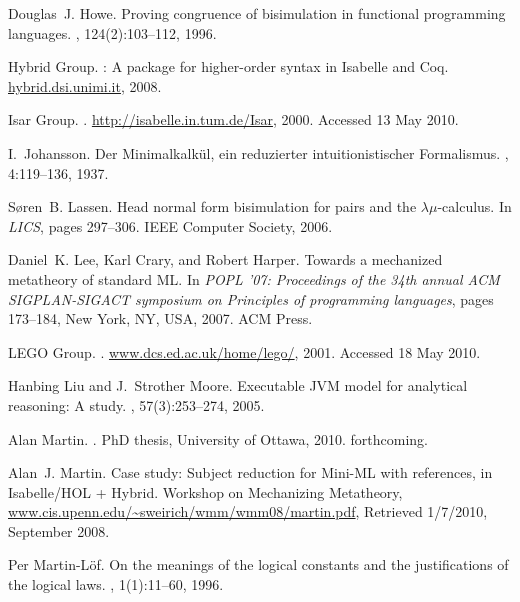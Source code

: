 \documentclass[final]{svjour3}
\begin{document}
\begin{thebibliography}{100}
Douglas~J. Howe.
\newblock Proving congruence of bisimulation in functional programming
  languages.
, 124(2):103--112, 1996.

{Hybrid Group}.
: {A} package for higher-order syntax in {Isabelle} and
  {Coq}.
\newblock \url{hybrid.dsi.unimi.it}, 2008.

{Isar Group}.
.
\newblock \url{http://isabelle.in.tum.de/Isar}, 2000. Accessed 13 May 2010.

I.~Johansson.
\newblock Der {Minimalkalkül}, ein reduzierter intuitionistischer
  {Formalismus}.
, 4:119--136, 1937.

S{\o}ren~B. Lassen.
\newblock Head normal form bisimulation for pairs and the
  $\lambda\mu$-calculus.
\newblock In {\em LICS}, pages 297--306. IEEE Computer Society, 2006.

Daniel~K. Lee, Karl Crary, and Robert Harper.
\newblock Towards a mechanized metatheory of standard {ML}.
\newblock In {\em POPL '07: Proceedings of the 34th annual ACM SIGPLAN-SIGACT
  symposium on Principles of programming languages}, pages 173--184, New York,
  NY, USA, 2007. ACM Press.

{{LEGO} Group}.
.
\newblock \url{www.dcs.ed.ac.uk/home/lego/}, 2001. Accessed 18 May 2010.

Hanbing Liu and J.~Strother Moore.
\newblock Executable {JVM} model for analytical reasoning: {A} study.
, 57(3):253--274, 2005.

Alan Martin.
.
\newblock PhD thesis, University of Ottawa, 2010.
\newblock forthcoming.

Alan~J. Martin.
\newblock Case study: Subject reduction for {M}ini-{M}{L} with references, in
  {Isabelle/HOL + Hybrid}.
\newblock Workshop on Mechanizing Metatheory, \url{
  www.cis.upenn.edu/~sweirich/wmm/wmm08/martin.pdf}, Retrieved 1/7/2010,
  September 2008.

Per Martin-L{\"o}f.
\newblock On the meanings of the logical constants and the justifications of
  the logical laws.
, 1(1):11--60, 1996.


\end{thebibliography}
\end{document}
